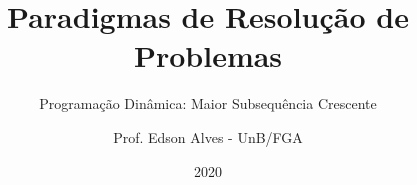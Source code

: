 \title{Paradigmas de Resolução de Problemas}
\subtitle{Programação Dinâmica: Maior Subsequência Crescente}
\author{Prof. Edson Alves - UnB/FGA}
\date{2020}
